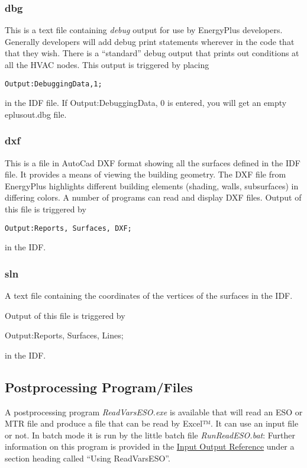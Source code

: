 \subsubsection{dbg}\label{dbg}

This is a text file containing \emph{debug} output for use by EnergyPlus developers. Generally developers will add debug print statements wherever in the code that that they wish. There is a ``standard'' debug output that prints out conditions at all the HVAC nodes. This output is triggered by placing

\begin{lstlisting}
Output:DebuggingData,1;
\end{lstlisting}

in the IDF file. If Output:DebuggingData, 0 is entered, you will get an empty eplusout.dbg file.

\subsubsection{dxf}\label{dxf}

This is a file in AutoCad DXF format showing all the surfaces defined in the IDF file. It provides a means of viewing the building geometry. The DXF file from EnergyPlus highlights different building elements (shading, walls, subsurfaces) in differing colors. A number of programs can read and display DXF files. Output of this file is triggered by

\begin{lstlisting}
Output:Reports, Surfaces, DXF;
\end{lstlisting}

in the IDF.

\subsubsection{sln}\label{sln}

A text file containing the coordinates of the vertices of the surfaces in the IDF.

Output of this file is triggered by

Output:Reports, Surfaces, Lines;

in the IDF.

\subsection{Postprocessing Program/Files}\label{postprocessing-programfiles}

A postprocessing program \emph{ReadVarsESO.exe} is available that will read an ESO or MTR file and produce a file that can be read by Excel™. It can use an input file or not. In batch mode it is run by the little batch file \emph{RunReadESO.bat}: Further information on this program is provided in the \href{file:///E:/Docs4PDFs/InputOutputReference.pdf}{Input Output Reference} under a section heading called ``Using ReadVarsESO''.
